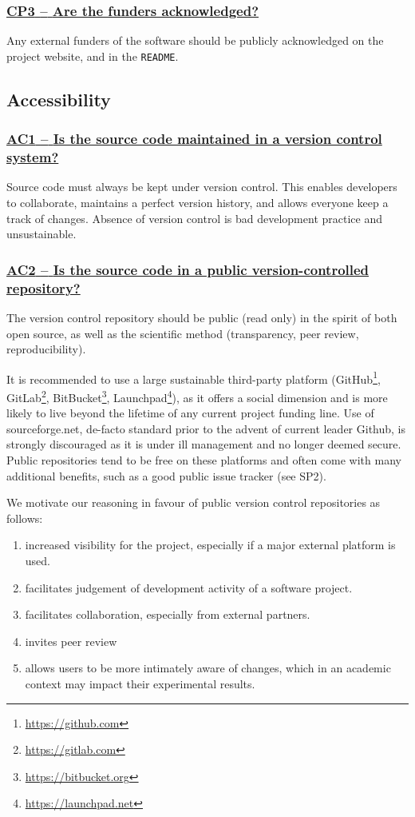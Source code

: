 \documentclass[a4paper,11pt]{article}
\newcommand{\criterion}[1]{\subsubsection*{\underline{#1}}}
\begin{document}
\newcommand{\cpThreeID}{CP3}
\newcommand{\cpThreeText}{Are the funders acknowledged?}
\criterion{\cpThreeID{ }--{ }\cpThreeText}\label{id:cp3} 

Any external funders of the software should be publicly acknowledged on the project
website, and in the \texttt{README}.

\subsection{Accessibility}\label{sec:acc}

\newcommand{\acOneID}{AC1}
\newcommand{\acOneText}{Is the source code maintained in a version control system?}
\criterion{\acOneID{ }--{ }\acOneText}\label{id:ac1} 

Source code must always be kept under version control. This enables developers
to collaborate, maintains a perfect version history, and allows everyone keep a
track of changes. Absence of version control is bad development practice and
unsustainable.

\newcommand{\acTwoID}{AC2}
\newcommand{\acTwoText}{Is the source code in a public version-controlled repository?}
\criterion{\acTwoID{ }--{ }\acTwoText}\label{id:ac2} 

The version control repository should be public (read only) in the spirit of both open
source, as well as the scientific method (transparency, peer review,
reproducibility). 

It is recommended to use a large sustainable third-party platform
(GitHub\footnote{\url{https://github.com}},
GitLab\footnote{\url{https://gitlab.com}},
BitBucket\footnote{\url{https://bitbucket.org}},
Launchpad\footnote{\url{https://launchpad.net}}), as it offers a social
dimension and is more likely to live beyond the lifetime of any current project
funding line. Use of sourceforge.net, de-facto standard prior to the advent of
current leader Github, is strongly discouraged as it is under ill management
and no longer deemed secure. Public repositories tend to be free on these platforms and
often come with many additional benefits, such as a good public issue tracker
(see SP2).

We motivate our reasoning in favour of public version control repositories as follows:

\begin{enumerate}
    \item increased visibility for the project, especially if a major external platform is used.
    \item facilitates judgement of development activity of a software project.
    \item facilitates collaboration, especially from external partners.
    \item invites peer review
    \item allows users to be more intimately aware of changes, which in an
        academic context may impact their experimental results.
\end{enumerate}
\end{document}
